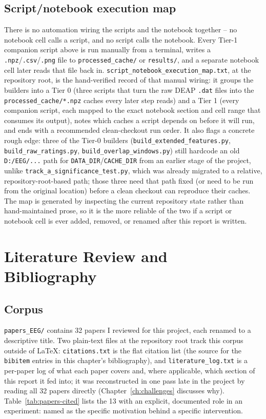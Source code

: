 \documentclass[11pt]{report}
\begin{document}
\section{Script/notebook execution map}
\label{sec:execution-map}
There is no automation wiring the scripts and the notebook together -- no
notebook cell calls a script, and no script calls the notebook. Every
Tier-1 companion script above is run manually from a terminal, writes a
\texttt{.npz}/\texttt{.csv}/\texttt{.png} file to \texttt{processed\_cache/}
or \texttt{results/}, and a separate notebook cell later reads that file
back in. \texttt{script\_notebook\_execution\_map.txt}, at the repository
root, is the hand-verified record of that manual wiring: it groups the
builders into a Tier 0 (three scripts that turn the raw DEAP \texttt{.dat}
files into the \texttt{processed\_cache/*.npz} caches every later step reads)
and a Tier 1 (every companion script, each mapped to the exact notebook
section and cell range that consumes its output), notes which caches a
script depends on before it will run, and ends with a recommended
clean-checkout run order. It also flags a concrete rough edge: three of the
Tier-0 builders (\texttt{build\_extended\_features.py},
\texttt{build\_raw\_ratings.py}, \texttt{build\_overlap\_windows.py}) still
hardcode an old \texttt{D:/EEG/...} path for \texttt{DATA\_DIR}/\texttt{CACHE\_DIR}
from an earlier stage of the project, unlike
\texttt{track\_a\_significance\_test.py}, which was already migrated to a
relative, repository-root-based path; those three need that path fixed (or
need to be run from the original location) before a clean checkout can
reproduce their caches. The map is generated by inspecting the current
repository state rather than hand-maintained prose, so it is the more
reliable of the two if a script or notebook cell is ever added, removed, or
renamed after this report is written.

\chapter{Literature Review and Bibliography}
\label{ch:literature}

\section{Corpus}
\texttt{papers\_EEG/} contains 32 papers I reviewed for this project, each
renamed to a descriptive title. Two plain-text files at the repository root
track this corpus outside of \LaTeX: \texttt{citations.txt} is the flat
citation list (the source for the \texttt{bibitem} entries in this chapter's
bibliography), and \texttt{literature\_log.txt} is a per-paper log of what
each paper covers and, where applicable, which section of this report it
fed into; it was reconstructed in one pass late in the project by reading
all 32 papers directly (Chapter~\ref{ch:challenges} discusses why).
Table~\ref{tab:papers-cited} lists the 13 with an explicit, documented role
in an experiment: named as the specific motivation behind a specific
intervention.
\end{document}
